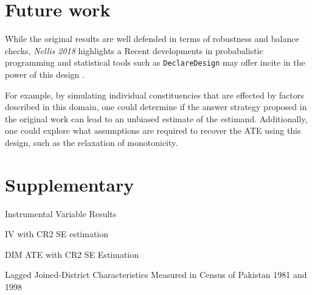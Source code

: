 \documentclass{scrartcl}
\begin{document}
\section{Future work}

While the original results are well defended in terms of robustness and balance checks,
\textit{Nellis 2018} highlights a 
Recent developments in probabalistic programming and statistical tools such as \texttt{DeclareDesign} may offer incite in the power of this design \cite{declaredesign}.

For example, by simulating individual constituencies that are effected by factors described in this domain, one could determine if the answer strategy proposed in the original work can lead to an unbiased estimate of the estimand.
Additionally, one could explore what assumptions are required to recover the ATE using this design, such as the relaxation of monotonicity.


\clearpage
\section{Supplementary}

\begin{table}[h!]
  \begin{center}
    \scalebox{0.75}{
      
    }
    \caption{Instrumental Variable Results}
    \label{table:iv_full}
  \end{center}
\end{table}

\begin{table}[h!]
  \begin{center}
    \scalebox{0.75}{
      
    }
    \caption{IV with CR2 SE estimation}
    \label{table:iv_cr2}
  \end{center}
\end{table}

\begin{table}[h!]
  \begin{center}
    \scalebox{0.75}{
      
    }
    \caption{DIM ATE with CR2 SE Estimation}
    \label{table:dim_cr2}
  \end{center}
\end{table}

\begin{table}[h!]
  \begin{center}
    \scalebox{0.65}{
      
    }
    \caption{Lagged Joined-District Characteristics Measured in Census of Pakistan 1981 and 1998}
    \label{table:pretreatment_census}
  \end{center}
\end{table}
\end{document}
